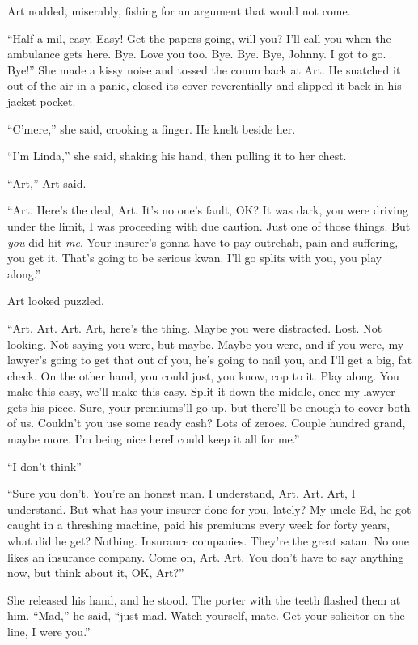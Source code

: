 Art nodded, miserably, fishing for an argument that would not
come.

“Half a mil, easy. Easy! Get the papers going, will you? I’ll call
you when the ambulance gets here. Bye. Love you too. Bye. Bye. Bye,
Johnny. I got to go. Bye!” She made a kissy noise and tossed the
comm back at Art. He snatched it out of the air in a panic, closed
its cover reverentially and slipped it back in his jacket pocket.

“C’mere,” she said, crooking a finger. He knelt beside her.

“I’m Linda,” she said, shaking his hand, then pulling it to her
chest.

“Art,” Art said.

“Art. Here’s the deal, Art. It’s no one’s fault, OK? It was dark,
you were driving under the limit, I was proceeding with due
caution. Just one of those things. But \emph{you} did hit
\emph{me}. Your insurer’s gonna have to pay out{\dash}rehab, pain and
suffering, you get it. That’s going to be serious kwan. I’ll go
splits with you, you play along.”

Art looked puzzled.

“Art. Art. Art. Art, here’s the thing. Maybe you were distracted.
Lost. Not looking. Not saying you were, but maybe. Maybe you were,
and if you were, my lawyer’s going to get that out of you, he’s
going to nail you, and I’ll get a big, fat check. On the other
hand, you could just, you know, cop to it. Play along. You make
this easy, we’ll make this easy. Split it down the middle, once my
lawyer gets his piece. Sure, your premiums’ll go up, but there’ll
be enough to cover both of us. Couldn’t you use some ready cash?
Lots of zeroes. Couple hundred grand, maybe more. I’m being nice
here{\dash}I could keep it all for me.”

“I don’t think{\dash}”

“Sure you don’t. You’re an honest man. I understand, Art. Art. Art,
I understand. But what has your insurer done for you, lately? My
uncle Ed, he got caught in a threshing machine, paid his premiums
every week for forty years, what did he get? Nothing. Insurance
companies. They’re the great satan. No one likes an insurance
company. Come on, Art. Art. You don’t have to say anything now, but
think about it, OK, Art?”

She released his hand, and he stood. The porter with the teeth
flashed them at him. “Mad,” he said, “just mad. Watch yourself,
mate. Get your solicitor on the line, I were you.”

